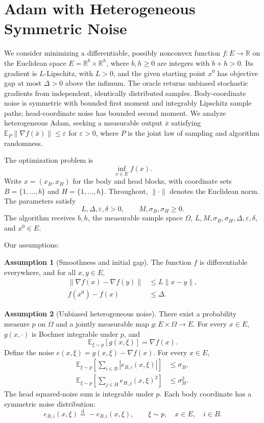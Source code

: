 \documentclass[10pt]{article}
\theoremstyle{definition}
\newtheorem{assumption}{Assumption}
\begin{document}
\section*{Adam with Heterogeneous Symmetric Noise}
We consider minimizing a differentiable, possibly nonconvex function $f:E\to\mathbb{R}$ on the Euclidean space $E=\mathbb{R}^b\times\mathbb{R}^h$, where $b,h\geq0$ are integers with $b+h>0$. Its gradient is $L$-Lipschitz, with $L>0$, and the given starting point $x^0$ has objective gap at most $\Delta>0$ above the infimum. The oracle returns unbiased stochastic gradients from independent, identically distributed samples. Body-coordinate noise is symmetric with bounded first moment and integrably Lipschitz sample paths; head-coordinate noise has bounded second moment. We analyze heterogeneous Adam, seeking a measurable output $\bar{x}$ satisfying $\mathbb{E}_{P}\|\nabla f(\bar{x})\|\leq\varepsilon$ for $\varepsilon>0$, where $P$ is the joint law of sampling and algorithm randomness.

The optimization problem is
\[
\inf_{x\in E} f(x).
\]
Write $x=(x_B,x_H)$ for the body and head blocks, with coordinate sets $B=\{1,\ldots,b\}$ and $H=\{1,\ldots,h\}$. Throughout, $\|\cdot\|$ denotes the Euclidean norm. The parameters satisfy
\[
L,\Delta,\varepsilon,\delta>0,
\qquad M,\sigma_B,\sigma_H\geq0.
\]
The algorithm receives $b,h$, the measurable sample space $\Omega$, $L,M,\sigma_B,\sigma_H,\Delta,\varepsilon,\delta$, and $x^0\in E$.

Our assumptions:
\begin{assumption}[Smoothness and initial gap]
The function $f$ is differentiable everywhere, and for all $x,y\in E$,
\[
\begin{aligned}
\|\nabla f(x)-\nabla f(y)\|&\leq L\|x-y\|,\\
f(x^0)-f(x)&\leq\Delta.
\end{aligned}
\]
\end{assumption}

\begin{assumption}[Unbiased heterogeneous noise]
There exist a probability measure $p$ on $\Omega$ and a jointly measurable map $g:E\times\Omega\to E$. For every $x\in E$, $g(x,\cdot)$ is Bochner integrable under $p$, and
\[
\mathbb{E}_{\xi\sim p}[g(x,\xi)]=\nabla f(x).
\]
Define the noise $e(x,\xi)=g(x,\xi)-\nabla f(x)$. For every $x\in E$,
\[
\begin{aligned}
\mathbb{E}_{\xi\sim p}\left[\sum_{i\in B}|e_{B,i}(x,\xi)|\right]&\leq\sigma_B,\\
\mathbb{E}_{\xi\sim p}\left[\sum_{j\in H}e_{H,j}(x,\xi)^2\right]&\leq\sigma_H^2.
\end{aligned}
\]
The head squared-noise sum is integrable under $p$. Each body coordinate has a symmetric noise distribution:
\[
e_{B,i}(x,\xi)\overset{\mathrm{d}}{=}-e_{B,i}(x,\xi),
\qquad \xi\sim p,\quad x\in E,\quad i\in B.
\]
\end{assumption}
\end{document}
